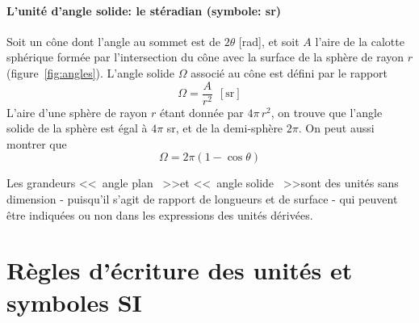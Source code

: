 \paragraph{L'unité d'angle solide: le stéradian (symbole: sr)} Soit un cône dont l'angle au sommet est de $2\theta$ [rad], et soit $A$ l'aire de la calotte sphérique formée par l'intersection du cône avec la surface de la sphère de rayon $r$ (figure~\ref{fig:angles}). L'angle solide $\Omega$ associé au cône est défini par le rapport
$$
    \Omega=\frac{A}{r^2}\ \ [\text{sr}]
$$
L'aire d'une sphère de rayon $r$ étant donnée par $4\pi\,r^2$, on trouve que l'angle solide de la sphère est égal à $4\pi$ sr, et de la demi-sphère $2\pi$. On peut aussi montrer que
$$
    \Omega=2\pi(1-\cos\theta)
$$

Les grandeurs \textless\textless\ angle plan \ \textgreater\textgreater et \textless\textless\ angle solide \ \textgreater\textgreater sont des unités sans dimension - puisqu'il s'agit de rapport de longueurs et de surface - qui peuvent être indiquées ou non dans les expressions des unités dérivées.

\section{Règles d'écriture des unités et symboles SI}

